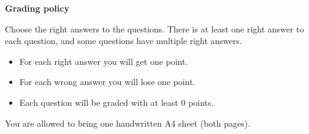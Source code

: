 \documentclass[answers,12pt]{exam}
\begin{document}
    \begin{center}
    \end{center}

    \vspace{5mm}

    \vspace{5mm}

    \begin{tcolorbox}[colback=white, colframe=black, boxrule=0.8pt]
        \begin{center}
            {\textbf{Grading policy}}
        \end{center}
        Choose the right answers to the questions.
        There is at least one right answer to each question, and some questions have multiple right answers.
        \begin{itemize}
            \item For each right answer you will get one point.
            \item For each wrong answer you will lose one point.
            \item Each question will be graded with at least $0$ points.
        \end{itemize}
        You are allowed to bring one handwritten A4 sheet (both pages).
    \end{tcolorbox}
\end{document}
